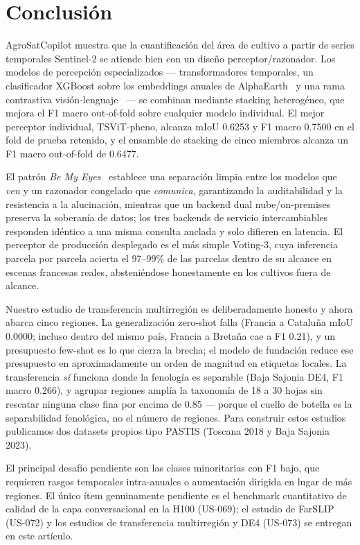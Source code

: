\section{Conclusión}
\label{sec:conclusion}

AgroSatCopilot muestra que la cuantificación del área de cultivo a partir
de series temporales Sentinel-2 se atiende bien con un diseño
perceptor/razonador. Los modelos de percepción especializados ---
transformadores temporales, un clasificador XGBoost sobre los embeddings
anuales de AlphaEarth~\cite{brown2025alphaearth} y una rama contrastiva
visión-lenguaje~\cite{li2025farslip} --- se combinan mediante stacking
heterogéneo, que mejora el F1 macro out-of-fold sobre cualquier modelo
individual. El mejor perceptor individual, TSViT-pheno, alcanza mIoU
0.6253 y F1 macro 0.7500 en el fold de prueba retenido, y el ensamble de
stacking de cinco miembros alcanza un F1 macro out-of-fold de 0.6477.

El patrón \emph{Be My Eyes}~\cite{huang2025bemyeyes} establece una
separación limpia entre los modelos que \emph{ven} y un razonador
congelado que \emph{comunica}, garantizando la auditabilidad y la
resistencia a la alucinación, mientras que un backend dual
nube/on-premises preserva la soberanía de datos; los tres backends de
servicio intercambiables responden idéntico a una misma consulta anclada
y solo difieren en latencia. El perceptor de producción desplegado es el
más simple Voting-3, cuya inferencia parcela por parcela acierta el
97--99\% de las parcelas dentro de su alcance en escenas francesas reales,
absteniéndose honestamente en los cultivos fuera de alcance.

Nuestro estudio de transferencia multirregión es deliberadamente honesto y
ahora abarca cinco regiones. La generalización zero-shot falla (Francia a
Cataluña mIoU 0.0000; incluso dentro del mismo país, Francia a Bretaña cae
a F1 0.21), y un presupuesto few-shot es lo que cierra la brecha; el modelo
de fundación reduce ese presupuesto en aproximadamente un orden de magnitud
en etiquetas locales. La transferencia \emph{sí} funciona donde la
fenología es separable (Baja Sajonia DE4, F1 macro 0.266), y agrupar
regiones amplía la taxonomía de 18 a 30 hojas sin rescatar ninguna clase
fina por encima de 0.85 --- porque el cuello de botella es la separabilidad
fenológica, no el número de regiones. Para construir estos estudios
publicamos dos datasets propios tipo PASTIS (Toscana 2018 y Baja Sajonia
2023).

El principal desafío pendiente son las clases minoritarias con F1 bajo, que
requieren rasgos temporales intra-anuales o aumentación dirigida en lugar
de más regiones. El único ítem genuinamente pendiente es el benchmark
cuantitativo de calidad de la capa conversacional en la H100 (US-069); el
estudio de FarSLIP (US-072) y los estudios de transferencia multirregión y
DE4 (US-073) se entregan en este artículo.
